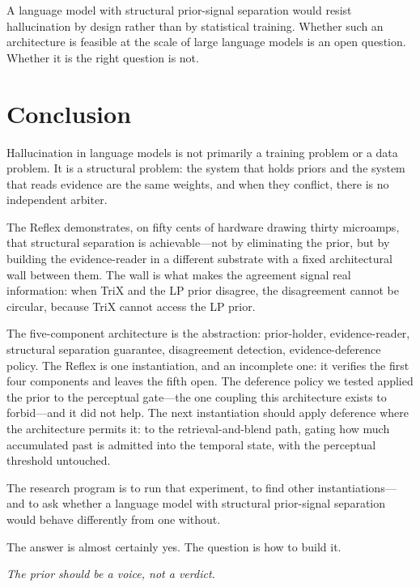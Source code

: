 \documentclass[11pt,letterpaper]{article}
\begin{document}
A language model with structural prior-signal separation would resist hallucination by design rather than by statistical training. Whether such an architecture is feasible at the scale of large language models is an open question. Whether it is the right question is not.

\section{Conclusion}

Hallucination in language models is not primarily a training problem or a data problem. It is a structural problem: the system that holds priors and the system that reads evidence are the same weights, and when they conflict, there is no independent arbiter.

The Reflex demonstrates, on fifty cents of hardware drawing thirty microamps, that structural separation is achievable---not by eliminating the prior, but by building the evidence-reader in a different substrate with a fixed architectural wall between them. The wall is what makes the agreement signal real information: when TriX and the LP prior disagree, the disagreement cannot be circular, because TriX cannot access the LP prior.

The five-component architecture is the abstraction: prior-holder, evidence-reader, structural separation guarantee, disagreement detection, evidence-deference policy. The Reflex is one instantiation, and an incomplete one: it verifies the first four components and leaves the fifth open. The deference policy we tested applied the prior to the perceptual gate---the one coupling this architecture exists to forbid---and it did not help. The next instantiation should apply deference where the architecture permits it: to the retrieval-and-blend path, gating how much accumulated past is admitted into the temporal state, with the perceptual threshold untouched.

The research program is to run that experiment, to find other instantiations---and to ask whether a language model with structural prior-signal separation would behave differently from one without.

The answer is almost certainly yes. The question is how to build it.

\textit{The prior should be a voice, not a verdict.}
\end{document}
